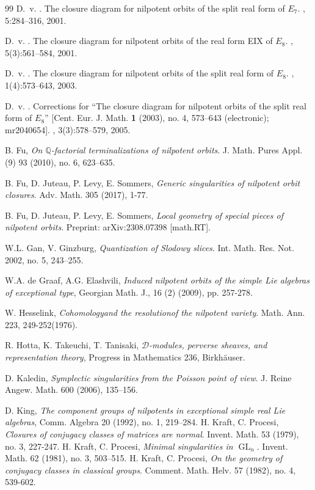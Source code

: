 \documentclass[12pt]{amsart}
\theoremstyle{definition}
\numberwithin{equation}{section}
\begin{document}
\begin{thebibliography}{99}
D.~v. .
\newblock The closure diagram for nilpotent orbits of the split real form of
{$E_7$}.
, 5:284--316, 2001.

D.~v. .
\newblock The closure diagram for nilpotent orbits of the real form {EIX} of
{$E_8$}.
, 5(3):561--584, 2001.

D.~v. .
\newblock The closure diagram for nilpotent orbits of the split real form of
{$E_8$}.
, 1(4):573--643, 2003.

D.~v. .
\newblock Corrections for ``{T}he closure diagram for nilpotent orbits of the
split real form of {$E_8$}'' [{C}ent. {E}ur. {J}. {M}ath. {\bf 1} (2003), no.
4, 573--643 (electronic); mr2040654].
, 3(3):578--579, 2005.

 B. Fu, {\it On $\mathbb{Q}$-factorial terminalizations of nilpotent orbits}.
J. Math. Pures Appl. (9) 93 (2010), no. 6, 623–635.

 B. Fu, D. Juteau, P. Levy, E. Sommers,
{\it Generic singularities of nilpotent orbit closures}.
Adv. Math. 305 (2017), 1-77.

 B. Fu, D. Juteau, P. Levy, E. Sommers, {\it Local geometry of special pieces of nilpotent orbits}. Preprint: arXiv:2308.07398 [math.RT].

 W.L. Gan, V. Ginzburg, {\it Quantization of Slodowy slices}. Int. Math. Res. Not. 2002, no. 5, 243–255.

W.A. de Graaf, A.G. Elashvili,
{\it Induced nilpotent orbits of the simple Lie algebras of exceptional type},
Georgian Math. J., 16 (2) (2009), pp. 257-278.

 {W. Hesselink},
{\it Cohomologyand the resolutionof the nilpotent variety}. Math. Ann. 223, 249-252(1976).

 R. Hotta, K. Takeuchi, T. Tanisaki, \emph{$\mathscr{D}$-modules, perverse sheaves, and representation theory}, Progress in Mathematics 236, Birkh\"auser.

 D. Kaledin, {\it Symplectic singularities from the Poisson point of view}. J. Reine Angew. Math. 600 (2006), 135–156.

 D. King, {\it The component groups of nilpotents in exceptional simple real Lie algebras}, Comm. Algebra 20 (1992), no. 1, 219–284.
 H. Kraft, C. Procesi, {\it Closures of conjugacy classes of matrices are normal}. Invent. Math. 53 (1979), no. 3, 227-247.
 H. Kraft, C. Procesi, {\it Minimal singularities in $\operatorname{GL}_n$}. Invent. Math. 62 (1981), no. 3, 503–515.
 H. Kraft, C. Procesi, {\it On the geometry of conjugacy classes in classical groups}. Comment. Math. Helv. 57 (1982), no. 4, 539-602.


\end{thebibliography}
\end{document}
